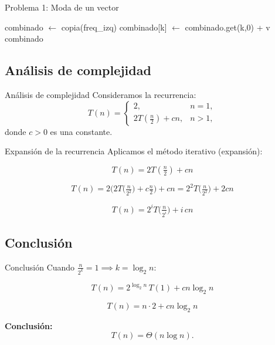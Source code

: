 \documentclass{beamer}
\begin{document}
\begin{frame}{Problema 1: Moda de un vector}
  \begin{algorithm}[H]
    \caption{Cálculo de la moda con Divide y Vencerás (Parte II)}
    \begin{algorithmic}[1]
        \State combinado $\gets$ copia(freq\_izq)
          \State combinado[k] $\gets$ combinado.get(k,0) + v
        \EndFor
        \State \Return combinado
      \EndFunction
      
    \end{algorithmic}
  \end{algorithm}
\end{frame}

\subsection{Análisis de complejidad}
\begin{frame}{Análisis de complejidad}
Consideramos la recurrencia:
\[
T(n)=
\begin{cases}
2, & n=1, \\[6pt]
2T\!\left(\tfrac{n}{2}\right) + c n, & n>1,
\end{cases}
\]
donde \(c>0\) es una constante.

\bigskip

\end{frame}

\begin{frame}{Expansión de la recurrencia}
Aplicamos el método iterativo (expansión):

\[
T(n) = 2T\!\left(\tfrac{n}{2}\right) + cn
\]

\[
T(n) = 2\Big(2T\!\big(\tfrac{n}{2^2}\big) + c\tfrac{n}{2}\Big) + cn
      = 2^2T\!\big(\tfrac{n}{2^2}\big) + 2cn
\]

\[
T(n) = 2^iT\!\big(\tfrac{n}{2^i}\big) + i \, cn
\]
\end{frame}

\subsection{Conclusión}
\begin{frame}{Conclusión}
Cuando \(\tfrac{n}{2^k}=1 \implies k=\log_2 n\):

\[
T(n) = 2^{\log_2 n}\,T(1) + cn\log_2 n
\]

\[
T(n) = n\cdot 2 + cn\log_2 n
\]

\bigskip
\textbf{Conclusión:}
\[
T(n) = \Theta(n\log n).
\]
\end{frame}
\end{document}
